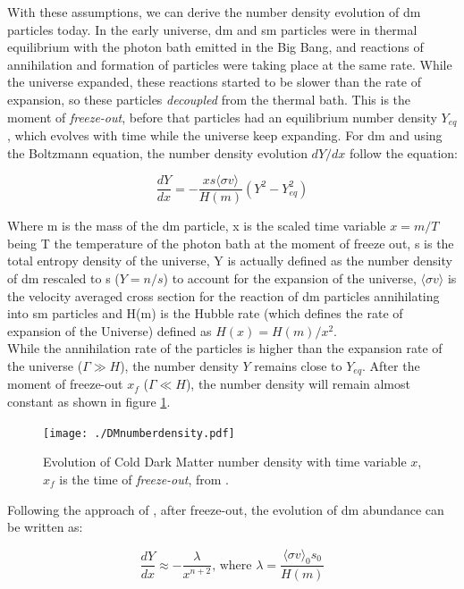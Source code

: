 \documentclass[main.tex]{subfiles}
\begin{document}
With these assumptions, we can derive the number density evolution of \gls{dm} particles today. In the early universe, \gls{dm} and \gls{sm} particles were in thermal equilibrium with the photon bath emitted in the Big Bang, and reactions of annihilation and formation of particles were taking place at the same rate. While the universe expanded, these reactions started to be slower than the rate of expansion, so these particles \textit{decoupled} from the thermal bath. This is the moment of \textit{freeze-out}, before that particles had an equilibrium number density $Y_{eq}$, which evolves with time while the universe keep expanding. For \gls{dm} and using the Boltzmann equation, the number density evolution $dY/dx$ follow the equation:

\begin{equation}
    \frac{dY}{dx} = -\frac{xs\langle\sigma v\rangle}{H(m)}(Y^{2}-Y^{2}_{eq})
    \label{eq:dmabundance}
\end{equation}

Where m is the mass of the \gls{dm} particle, x is the scaled time variable $x=m/T$ being T the temperature of the photon bath at the moment of freeze out, s is the total entropy density of the universe, Y is actually defined as the number density of \gls{dm} rescaled to s ($Y = n/s$) to account for the expansion of the universe, $\langle\sigma v\rangle$ is the velocity averaged cross section for the reaction of \gls{dm} particles annihilating into \gls{sm} particles and H(m) is the Hubble rate (which defines the rate of expansion of the Universe) defined as $H(x) = H(m)/x^2$.\\
While the annihilation rate of the particles is higher than the expansion rate of the universe ($\Gamma \gg H $), the number density $Y$ remains close to $Y_{eq}$. After the moment of freeze-out $x_f$ ($\Gamma \ll H$), the number density will remain almost constant as shown in figure \ref{fig:DMn}. 

\begin{figure}
\centering
 \texttt{[image: ./DMnumberdensity.pdf]}
  \caption{Evolution of Cold Dark Matter number density with time variable $x$, $x_{f}$ is the time of \textit{freeze-out}, from \cite{2017DMlectures}.}
    \label{fig:DMn}
\end{figure}

Following the approach of \cite{2017DMlectures}, after freeze-out, the evolution of \gls{dm} abundance can be written as:

\begin{equation}
    \frac{dY}{dx}\approx - \frac{\lambda}{x^{n+2}} \textrm{, where } \lambda = \frac{\langle\sigma v \rangle_{0}s_{0}}{H(m)}
\end{equation}
\end{document}
